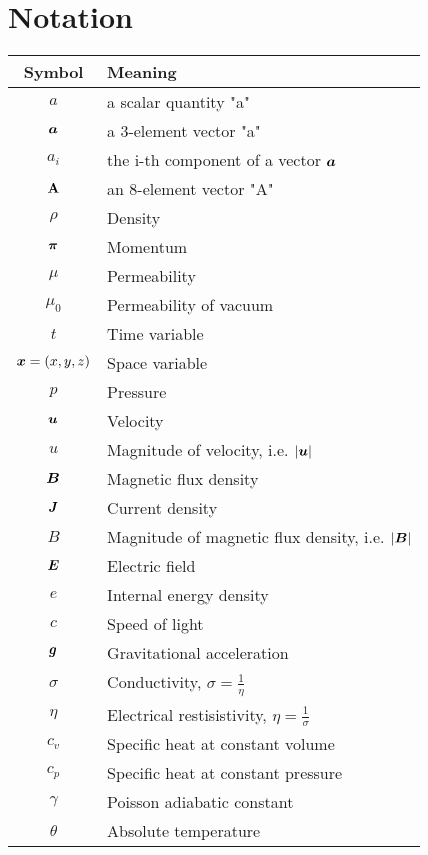 \section*{Notation}

\begin{table}
    \centering
    \begin{tabular}{ |c|l| } 
        \hline
        Symbol & Meaning \\ 
        \hline
        $a$ & a scalar quantity "a"\\
        $\mbox{\boldmath $a$}$ & a 3-element vector "a"\\
        $a_i$ & the i-th component of a vector $\mbox{\boldmath $a$}$ \\
        $\mathrm{\mathbf{A}}$ & an 8-element vector "A" \\
        \hline
        $\rho$ & Density \\ 
        $\mbox{\boldmath $\pi$}$ & Momentum \\ 
        $\mu$ & Permeability \\ 
        $\mu_0$ & Permeability of vacuum\\ 
        $t$ & Time variable\\ 
        $\mbox{\boldmath $x$} = \left( x, y, z\right)$ & Space variable \\ 
        $p$ & Pressure \\ 
        $\mbox{\boldmath $u$}$ & Velocity \\ 
        $u$ & Magnitude of velocity, i.e. $|\mbox{\boldmath $u$}|$ \\ 
        $\mbox{\boldmath $B$}$ & Magnetic flux density \\ 
        $\mbox{\boldmath $J$}$ & Current density\\ 
        $B$ & Magnitude of magnetic flux density, i.e. $|\mbox{\boldmath $B$}|$ \\ 
        $\mbox{\boldmath $E$}$ & Electric field\\ 
        $e$ & Internal energy density \\ 
        $c$ & Speed of light\\ 
        $\mbox{\boldmath $g$}$ & Gravitational acceleration\\ 
        $\sigma$ & Conductivity, $\sigma = \frac{1}{\eta}$\\ 
        $\eta$ & Electrical restisistivity, $\eta = \frac{1}{\sigma}$\\
        $c_v$ & Specific heat at constant volume\\
        $c_p$ & Specific heat at constant pressure\\
        $\gamma$ & Poisson adiabatic constant\\
        $\theta$ & Absolute temperature\\

\end{tabular}
\end{table}
